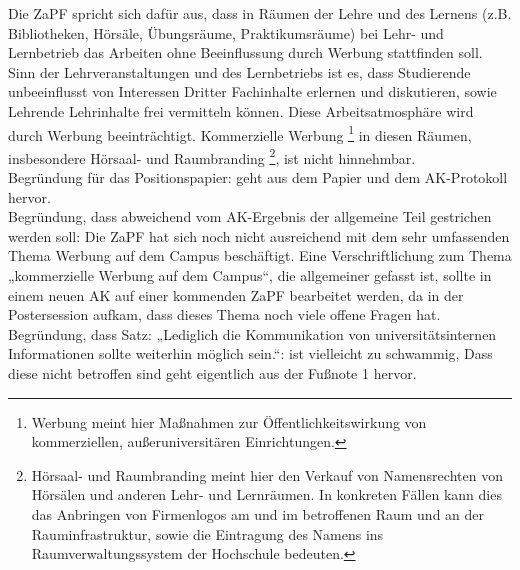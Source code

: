 			Die ZaPF spricht sich dafür aus, dass in Räumen der Lehre und des Lernens (z.B. Bibliotheken, Hörsäle, Übungsräume, Praktikumsräume) bei Lehr- und Lernbetrieb das Arbeiten ohne Beeinflussung durch Werbung stattfinden soll. Sinn der Lehrveranstaltungen und des Lernbetriebs ist es, dass Studierende unbeeinflusst von Interessen Dritter Fachinhalte erlernen und diskutieren, sowie Lehrende Lehrinhalte frei vermitteln können. Diese Arbeitsatmosphäre wird durch Werbung beeinträchtigt.
			Kommerzielle Werbung \footnote{Werbung meint hier Maßnahmen zur Öffentlichkeitswirkung von kommerziellen, außeruniversitären Einrichtungen.} in diesen Räumen, insbesondere Hörsaal- und Raumbranding \footnote{Hörsaal- und Raumbranding meint hier den Verkauf von Namensrechten von Hörsälen und anderen Lehr- und Lernräumen. In konkreten Fällen kann dies das Anbringen von Firmenlogos am und im betroffenen Raum und an der Rauminfrastruktur, sowie die Eintragung des Namens ins Raumverwaltungssystem der Hochschule bedeuten. }, ist nicht hinnehmbar. \\

			Begründung für das Positionspapier:
			geht aus dem Papier und dem AK-Protokoll hervor. \\

			Begründung, dass abweichend vom AK-Ergebnis der allgemeine Teil gestrichen werden soll:
			Die ZaPF hat sich noch nicht ausreichend mit dem sehr umfassenden Thema Werbung auf dem Campus beschäftigt. Eine Verschriftlichung zum Thema „kommerzielle Werbung auf dem Campus“, die allgemeiner gefasst ist, sollte in einem neuen AK auf einer kommenden ZaPF bearbeitet werden, da in der Postersession aufkam, dass dieses Thema noch viele offene Fragen hat. \\

			Begründung, dass Satz: „Lediglich die Kommunikation von universitätsinternen Informationen sollte weiterhin möglich sein.“: ist vielleicht zu schwammig, Dass diese nicht betroffen sind geht eigentlich aus der Fußnote 1 hervor.

